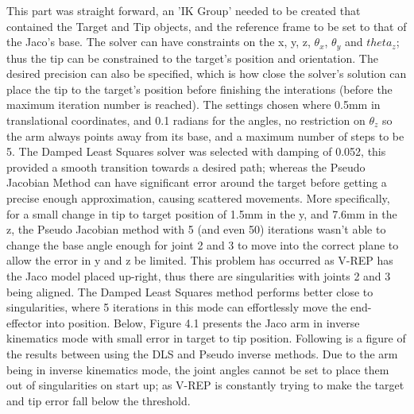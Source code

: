\documentclass[12pt,openany,a4paper]{book}
\begin{document}
This part was straight forward, an 'IK Group' needed to be created that contained the Target and Tip objects, and the reference frame to be set to that of the Jaco's base. The solver can have constraints on the x, y, z, $\theta_x$, $\theta_y$ and $theta_z$; thus the tip can be constrained to the target's position and orientation. The desired precision can also be specified, which is how close the solver's solution can place the tip to the target's position before finishing the interations (before the maximum iteration number is reached). The settings chosen where 0.5mm in translational coordinates, and 0.1 radians for the angles, no restriction on $\theta_z$ so the arm always points away from its base, and a maximum number of steps to be 5. The Damped Least Squares solver was selected with damping of 0.052, this provided a smooth transition towards a desired path; whereas the Pseudo Jacobian Method can have significant error around the target before getting a precise enough approximation, causing scattered movements. More specifically, for a small change in tip to target position of 1.5mm in the y, and 7.6mm in the z, the Pseudo Jacobian method with 5 (and even 50) iterations wasn't able to change the base angle enough for joint 2 and 3 to move into the correct plane to allow the error in y and z be limited. This problem has occurred as V-REP has the Jaco model placed up-right, thus there are singularities with joints 2 and 3 being aligned. The Damped Least Squares method performs better close to singularities, where 5 iterations in this mode can effortlessly move the end-effector into position. Below, Figure 4.1 presents the Jaco arm in inverse kinematics mode with small error in target to tip position. Following is a figure of the results between using the DLS and Pseudo inverse methods. Due to the arm being in inverse kinematics mode, the joint angles cannot be set to place them out of singularities on start up; as V-REP is constantly trying to make the target and tip error fall below the threshold.
\end{document}
